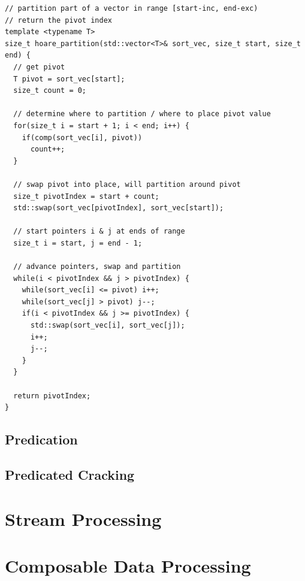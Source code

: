 \begin{verbatim}
// partition part of a vector in range [start-inc, end-exc)
// return the pivot index
template <typename T>
size_t hoare_partition(std::vector<T>& sort_vec, size_t start, size_t end) {
  // get pivot
  T pivot = sort_vec[start];
  size_t count = 0;
  
  // determine where to partition / where to place pivot value 
  for(size_t i = start + 1; i < end; i++) {
    if(comp(sort_vec[i], pivot))
      count++;
  }

  // swap pivot into place, will partition around pivot
  size_t pivotIndex = start + count;
  std::swap(sort_vec[pivotIndex], sort_vec[start]);

  // start pointers i & j at ends of range  
  size_t i = start, j = end - 1;

  // advance pointers, swap and partition
  while(i < pivotIndex && j > pivotIndex) {
    while(sort_vec[i] <= pivot) i++;
    while(sort_vec[j] > pivot) j--;
    if(i < pivotIndex && j >= pivotIndex) {
      std::swap(sort_vec[i], sort_vec[j]);
      i++;
      j--;
    }
  }

  return pivotIndex;
}
\end{verbatim}


\subsection{Predication}

\subsection{Predicated Cracking}

\section{Stream Processing}
\section{Composable Data Processing}


